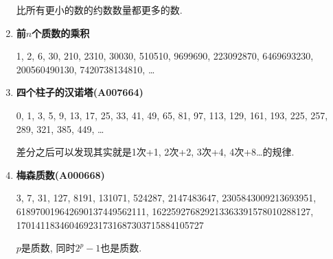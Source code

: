 \begin{enumerate}
比所有更小的数的约数数量都更多的数.

\item \textbf{前$n$个质数的乘积}

1, 2, 6, 30, 210, 2310, 30030, 510510, 9699690, 223092870, 6469693230, 200560490130, 7420738134810, \dots

\item \textbf{四个柱子的汉诺塔(A007664)}

0, 1, 3, 5, 9, 13, 17, 25, 33, 41, 49, 65, 81, 97, 113, 129, 161, 193, 225, 257, 289, 321, 385, 449, \dots

差分之后可以发现其实就是1次+1, 2次+2, 3次+4, 4次+8\dots 的规律.

\item \textbf{梅森质数(A000668)}

3, 7, 31, 127, 8191, 131071, 524287, 2147483647, 2305843009213693951, 618970019642690137449562111, 162259276829213363391578010288127,\\170141183460469231731687303715884105727

$p$是质数, 同时$2^p - 1$也是质数.

\end{enumerate}